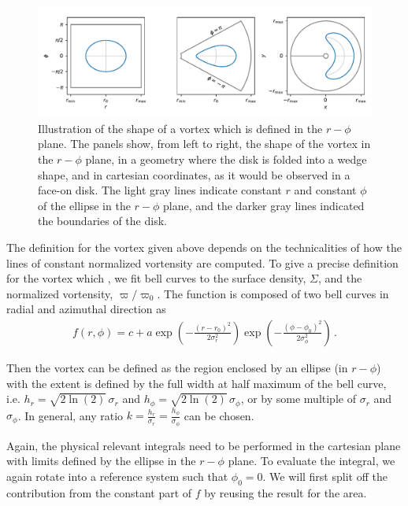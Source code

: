 \documentclass[a4paper]{scrartcl}
\begin{document}
\begin{figure}
  \begin{center}
    \includegraphics[width=\textwidth]{geometries.pdf}
    \caption{\label{fig:geometries}Illustration of the shape of a vortex which is defined in the $r-\phi$ plane.
    The panels show, from left to right, the shape of the vortex in the $r-\phi$ plane, 
    in a geometry where the disk is folded into a wedge shape, 
    and in cartesian coordinates, as it would be observed in a face-on disk.
    The light gray lines indicate constant $r$ and constant $\phi$ of the ellipse in the $r-\phi$ plane,
    and the darker gray lines indicated the boundaries of the disk.}
  \end{center}
\end{figure}

The definition for the vortex given above depends on the technicalities of how 
the lines of constant normalized vortensity are computed.
To give a precise definition for the vortex which , we fit bell curves to the surface density, $\Sigma$,
and the normalized vortensity, $\varpi/\varpi_0$.
The function is composed of two bell curves in radial and azimuthal direction as
\begin{align}
  f(r, \phi) = c + a \exp\left( - \frac{(r - r_0)^2}{2 \sigma_r^2} \right) \exp\left( - \frac{(\phi - \phi_0)^2}{2 \sigma_\phi^2} \right)\,.
\end{align}

Then the vortex can be defined as the region enclosed by an ellipse (in $r-\phi$)
with the extent is defined by the full width at half maximum of the bell curve, i.e. $h_r = \sqrt{2 \ln(2)} \,\sigma_r$
and $h_\phi = \sqrt{2 \ln(2)} \, \sigma_\phi$, or by some multiple of $\sigma_r$ and $\sigma_\phi$.
In general, any ratio $k = \frac{h_r}{\sigma_r} = \frac{h_\phi}{\sigma_\phi}$ can be chosen.

Again, the physical relevant integrals need to be performed in the cartesian plane with limits defined by
the ellipse in the $r-\phi$ plane.
To evaluate the integral, we again rotate into a reference system such that $\phi_0 = 0$.
We will first split off the contribution from the constant part of $f$ by reusing the result for the area.
\end{document}
